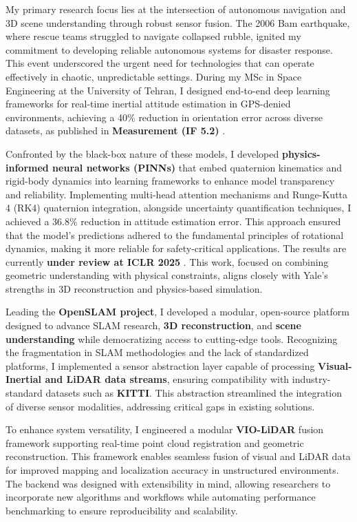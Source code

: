 \documentclass[a4,20pt]{article}
\begin{document}
\begin{large} 

My primary research focus lies at the intersection of autonomous navigation and 3D scene understanding through robust sensor fusion. The 2006 Bam earthquake, where rescue teams struggled to navigate collapsed rubble, ignited my commitment to developing reliable autonomous systems for disaster response. This event underscored the urgent need for technologies that can operate effectively in chaotic, unpredictable settings. During my MSc in Space Engineering at the University of Tehran, I designed end-to-end deep learning frameworks for real-time inertial attitude estimation in GPS-denied environments, achieving a 40\% reduction in orientation error across diverse datasets, as published in \textbf{Measurement (IF 5.2)} \cite{golroudbari2023generalizable}.

Confronted by the black-box nature of these models, I developed \textbf{physics-informed neural networks (PINNs)} that embed quaternion kinematics and rigid-body dynamics into learning frameworks to enhance model transparency and reliability. Implementing multi-head attention mechanisms and Runge-Kutta 4 (RK4) quaternion integration, alongside uncertainty quantification techniques, I achieved a 36.8\% reduction in attitude estimation error. This approach ensured that the model’s predictions adhered to the fundamental principles of rotational dynamics, making it more reliable for safety-critical applications. The results are currently \textbf{under review at ICLR 2025} \cite{golroudbari2024te}. This work, focused on combining geometric understanding with physical constraints, aligns closely with Yale's strengths in 3D reconstruction and physics-based simulation.

Leading the \textbf{OpenSLAM project}, I developed a modular, open-source platform designed to advance SLAM research, \textbf{3D reconstruction}, and \textbf{scene understanding} while democratizing access to cutting-edge tools. Recognizing the fragmentation in SLAM methodologies and the lack of standardized platforms, I implemented a sensor abstraction layer capable of processing \textbf{Visual-Inertial and LiDAR data streams}, ensuring compatibility with industry-standard datasets such as \textbf{KITTI}. This abstraction streamlined the integration of diverse sensor modalities, addressing critical gaps in existing solutions.

To enhance system versatility, I engineered a modular \textbf{VIO-LiDAR }fusion framework supporting real-time point cloud registration and geometric reconstruction. This framework enables seamless fusion of visual and LiDAR data for improved mapping and localization accuracy in unstructured environments. The backend was designed with extensibility in mind, allowing researchers to incorporate new algorithms and workflows while automating performance benchmarking to ensure reproducibility and scalability.


\end{large}
\end{document}
